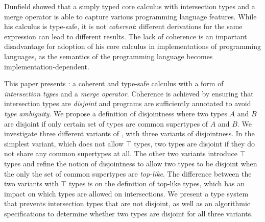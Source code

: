 Dunfield showed that a simply typed core calculus with intersection
types and a merge operator is able to capture various programming
language features. While his calculus is type-safe, it is not
\emph{coherent}: different derivations for the same expression can
lead to different results. The lack of coherence is an important
disadvantage for adoption of his core calculus in implementations of
programming languages, as the semantics of the programming language
becomes implementation-dependent.

This paper presents \name: a coherent and type-safe calculus with a
form of \emph{intersection types} and a \emph{merge
operator}. Coherence is achieved by ensuring that intersection types
are \emph{disjoint} and programs are sufficiently
annotated to avoid \emph{type ambiguity}. We propose a definition of disjointness where two
types $A$ and $B$ are disjoint if only certain set of types are common
supertypes of $A$ and $B$. We investigate three different variants of
\name, with three variants of disjointness. In the simplest
variant, which does not allow $\top$ types, two types are disjoint if
they do not share any common supertypes at all. The other two variants
introduce $\top$ types and refine the notion of disjointness to allow
two types to be disjoint when the only the set of common supertypes are
\emph{top-like}. The difference between the two variants with $\top$
types is on the definition of top-like types, which has an impact on
which types are allowed on intersections. We present a type system
that prevents intersection types that are not disjoint, as well as an
algorithmic specifications to determine whether two types are disjoint
for all three variants.